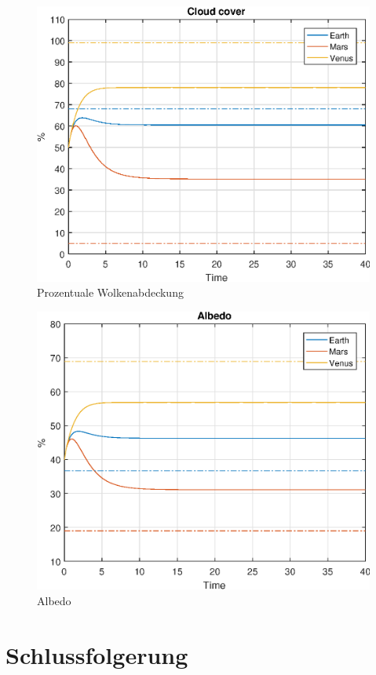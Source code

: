 \begin{refsection}
		\begin{figure}
			\center
			\includegraphics[height=0.45\textheight]{Matlab/figures/cloudCover.eps}
			\caption{Prozentuale Wolkenabdeckung}
		\end{figure}
		
		\begin{figure}
			\center
			\includegraphics[height=0.45\textheight]{Matlab/figures/albedo.eps}
			\caption{Albedo}
		\end{figure}

\section{Schlussfolgerung}


\end{refsection}
